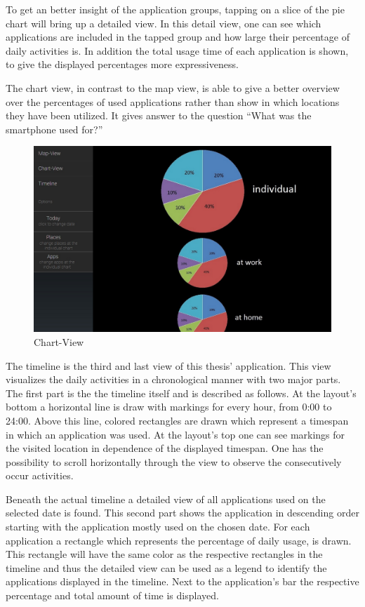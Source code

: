 To  get an better insight of the application groups, tapping on a slice of the pie chart will bring up a detailed view. In this detail view, one can see which applications are included in the tapped group and how large their percentage of daily activities is. In addition the total usage time of each application is shown, to give the displayed percentages more expressiveness.

The chart view, in contrast to the map view, is able to give a better overview over the percentages of used applications rather than show in which locations they have been utilized. It gives answer to the question ``What was the smartphone used for?''
\begin{figure}[h]
	\caption{Chart-View}
	\includegraphics[width=\textwidth]{images/Design/2_ChartView.jpg}
\end{figure}

The  timeline is the third and last view of this thesis' application. This view visualizes the daily activities in a chronological manner with two major parts. The first part is the the timeline itself and is described as follows. At the layout's bottom a horizontal line is draw with markings for every hour, from 0:00 to 24:00. Above this line, colored rectangles are drawn which represent a timespan in which an application was used. At the layout's top one can see markings for the visited location in dependence of the displayed timespan. One has the possibility to scroll horizontally through the view to observe the consecutively occur activities.

Beneath  the actual timeline a detailed view of all applications used on the selected date is found. This second part shows the application in descending order starting with the application mostly used on the chosen date. For each application a rectangle which represents the percentage of daily usage, is drawn. This rectangle will have the same color as the respective rectangles in the timeline and thus the detailed view can be used as a legend to identify the applications displayed in the timeline. Next to the application's bar the respective percentage and total amount of time is displayed.

